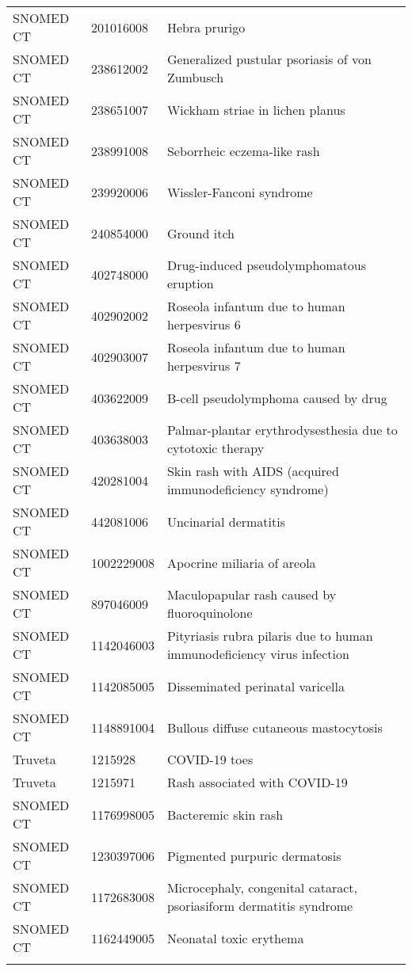 \begin{longtable}{p{}p{}p{}}
  SNOMED CT & 201016008 & Hebra prurigo \\ 
  SNOMED CT & 238612002 & Generalized pustular psoriasis of von Zumbusch \\ 
  SNOMED CT & 238651007 & Wickham striae in lichen planus \\ 
  SNOMED CT & 238991008 & Seborrheic eczema-like rash \\ 
  SNOMED CT & 239920006 & Wissler-Fanconi syndrome \\ 
  SNOMED CT & 240854000 & Ground itch \\ 
  SNOMED CT & 402748000 & Drug-induced pseudolymphomatous eruption \\ 
  SNOMED CT & 402902002 & Roseola infantum due to human herpesvirus 6 \\ 
  SNOMED CT & 402903007 & Roseola infantum due to human herpesvirus 7 \\ 
  SNOMED CT & 403622009 & B-cell pseudolymphoma caused by drug \\ 
  SNOMED CT & 403638003 & Palmar-plantar erythrodysesthesia due to cytotoxic therapy \\ 
  SNOMED CT & 420281004 & Skin rash with AIDS (acquired immunodeficiency syndrome) \\ 
  SNOMED CT & 442081006 & Uncinarial dermatitis \\ 
  SNOMED CT & 1002229008 & Apocrine miliaria of areola \\ 
  SNOMED CT & 897046009 & Maculopapular rash caused by fluoroquinolone \\ 
  SNOMED CT & 1142046003 & Pityriasis rubra pilaris due to human immunodeficiency virus infection \\ 
  SNOMED CT & 1142085005 & Disseminated perinatal varicella \\ 
  SNOMED CT & 1148891004 & Bullous diffuse cutaneous mastocytosis \\ 
  Truveta & 1215928 & COVID-19 toes \\ 
  Truveta & 1215971 & Rash associated with COVID-19 \\ 
  SNOMED CT & 1176998005 & Bacteremic skin rash \\ 
  SNOMED CT & 1230397006 & Pigmented purpuric dermatosis \\ 
  SNOMED CT & 1172683008 & Microcephaly, congenital cataract, psoriasiform dermatitis syndrome \\ 
  SNOMED CT & 1162449005 & Neonatal toxic erythema \\ 
  \hline
\label{tab:codes_rash}
\end{longtable}
